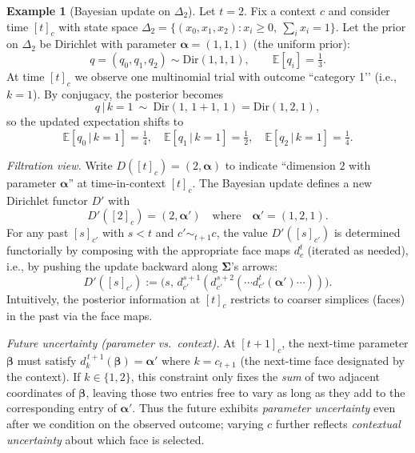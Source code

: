 \documentclass[12pt, a4paper]{amsart}
\theoremstyle{plain}
\theoremstyle{definition}
\newtheorem{exmp}[thm]{Example}
\numberwithin{figure}{section}
\numberwithin{table}{section}
\newcommand{\twc}[2]{ %
  [ #1 ]_{ #2 }
}
\numberwithin{equation}{section}
\newcommand{\bSigma}{\mathbf{\Sigma}}
\begin{document}
\begin{exmp}[Bayesian update on $\Delta_2$]

Let
$t = 2$.
Fix a context $c$ and consider time 
$\twc{t}{c}$ 
with state space 
$
\Delta_2=\{(x_0,x_1,x_2): x_i\ge 0,\ \sum_i x_i=1\}
$.
Let the prior on 
$\Delta_2$ 
be Dirichlet with parameter 
$
\boldsymbol{\alpha}
	=
(1,1,1)
$ 
(the uniform prior):
\[
q
	=
(q_0,q_1,q_2)
	\sim 
\mathrm{Dir}(1,1,1),
	\qquad 
\mathbb{E}[q_i]=\tfrac{1}{3}.
\]
At time $\twc{t}{c}$ 
we observe one multinomial trial with outcome ``category 1’’ (i.e., $k=1$). 
By conjugacy, the posterior becomes
\[
q\,|\,k=1\ \sim\ \mathrm{Dir}(1,\,1+1,\,1) = \mathrm{Dir}(1,2,1),
\]
so the updated expectation shifts to
\[
\mathbb{E}[q_0\,|\,k=1]=\tfrac{1}{4},\quad 
\mathbb{E}[q_1\,|\,k=1]=\tfrac{1}{2},\quad 
\mathbb{E}[q_2\,|\,k=1]=\tfrac{1}{4}.
\]

\emph{Filtration view.} 
Write 
$
D([t]_c)
	=
(2,
\boldsymbol{\alpha}
)
$
to indicate ``dimension $2$ with parameter 
$
\boldsymbol{\alpha}
$'' 
at time-in-context 
$\twc{t}{c}$. 
The Bayesian update defines a new Dirichlet functor $D'$ with
\[
D'([2]_c)
	=
(
	2,
	\boldsymbol{\alpha}'
)
	\quad\text{where}\quad
\boldsymbol{\alpha}'
	=
(1,2,1).
\]
For any past 
$\twc{s}{c'}$
 with 
$s < t$
and
$c'\sim_{t+1} c$, 
the value 
$D'(\twc{s}{c'})$ 
is determined functorially by composing with the appropriate face maps 
$d^t_c$
 (iterated as needed), 
i.e., by pushing the update backward along 
$\bSigma$’s arrows:
\[
D'(\twc{s}{c'})
	:=
\big(
	s, 
		\,
	d^{s+1}_{c'}(
		d^{s+2}_{c'}(
			\cdots
			d^{t}_{c'}(
				\boldsymbol{\alpha}'
			)
			\cdots
		)
	)
\big).
\]
Intuitively, 
the posterior information at $\twc{t}{c}$ restricts to coarser simplices (faces) in the past via the face maps.

\emph{Future uncertainty (parameter vs.\ context).} 
At 
$\twc{t+1}{c}$, 
the next-time parameter 
$
\boldsymbol{\beta}
$ 
must satisfy 
$
d^{\,t+1}_{k}(
	\boldsymbol{\beta}
)
	=
\boldsymbol{\alpha}'
$
where 
$
k
	=
c_{t+1}
$
(the next-time face designated by the context). 
If 
$
k \in \{1,2\}
$, 
this constraint only fixes the \emph{sum} of two adjacent coordinates of 
$
\boldsymbol{\beta}
$, 
leaving those two entries free to vary 
as long as they add to the corresponding entry of 
$
\boldsymbol{\alpha}'
$. 
Thus 
the future exhibits \emph{parameter uncertainty} even after we condition on the observed outcome; 
varying $c$ further reflects \emph{contextual uncertainty} about which face is selected.

\end{exmp}
\end{document}
